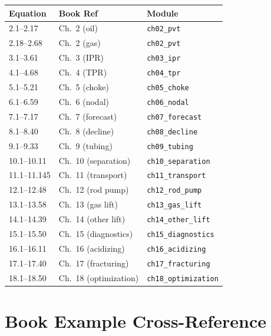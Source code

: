 \documentclass[11pt,a4paper,openany]{book}
\newcommand{\code}[1]{\texttt{#1}}
\begin{document}
\begin{longtable}{@{}lll@{}}
\toprule
Equation & Book Ref & Module \\
\midrule
2.1--2.17 & Ch.~2 (oil) & \code{ch02\_pvt} \\
2.18--2.68 & Ch.~2 (gas) & \code{ch02\_pvt} \\
3.1--3.61 & Ch.~3 (IPR) & \code{ch03\_ipr} \\
4.1--4.68 & Ch.~4 (TPR) & \code{ch04\_tpr} \\
5.1--5.21 & Ch.~5 (choke) & \code{ch05\_choke} \\
6.1--6.59 & Ch.~6 (nodal) & \code{ch06\_nodal} \\
7.1--7.17 & Ch.~7 (forecast) & \code{ch07\_forecast} \\
8.1--8.40 & Ch.~8 (decline) & \code{ch08\_decline} \\
9.1--9.33 & Ch.~9 (tubing) & \code{ch09\_tubing} \\
10.1--10.11 & Ch.~10 (separation) & \code{ch10\_separation} \\
11.1--11.145 & Ch.~11 (transport) & \code{ch11\_transport} \\
12.1--12.48 & Ch.~12 (rod pump) & \code{ch12\_rod\_pump} \\
13.1--13.58 & Ch.~13 (gas lift) & \code{ch13\_gas\_lift} \\
14.1--14.39 & Ch.~14 (other lift) & \code{ch14\_other\_lift} \\
15.1--15.50 & Ch.~15 (diagnostics) & \code{ch15\_diagnostics} \\
16.1--16.11 & Ch.~16 (acidizing) & \code{ch16\_acidizing} \\
17.1--17.40 & Ch.~17 (fracturing) & \code{ch17\_fracturing} \\
18.1--18.50 & Ch.~18 (optimization) & \code{ch18\_optimization} \\
\bottomrule
\end{longtable}

\chapter{Book Example Cross-Reference}
\end{document}
